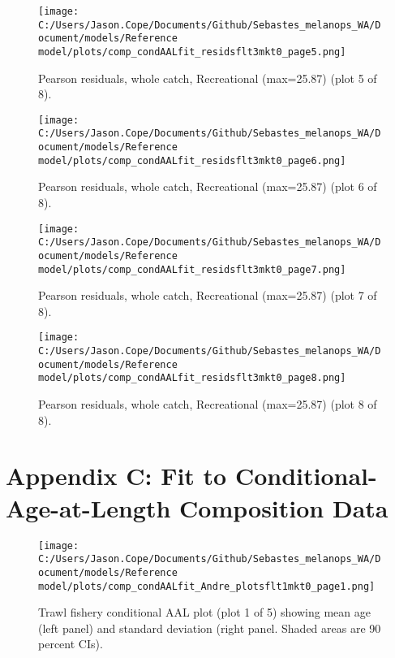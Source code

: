 \documentclass[11pt,
  english,
  letterpaper,
]{article}
\begin{document}
\begin{figure}
\centering
\texttt{[image: C:/Users/Jason.Cope/Documents/Github/Sebastes\_melanops\_WA/Document/models/Reference model/plots/comp\_condAALfit\_residsflt3mkt0\_page5.png]}
\caption{Pearson residuals, whole catch, Recreational (max=25.87) (plot 5 of 8).\label{fig:comp_condAALfit_residsflt3mkt0_page5}}
\end{figure}

\begin{figure}
\centering
\texttt{[image: C:/Users/Jason.Cope/Documents/Github/Sebastes\_melanops\_WA/Document/models/Reference model/plots/comp\_condAALfit\_residsflt3mkt0\_page6.png]}
\caption{Pearson residuals, whole catch, Recreational (max=25.87) (plot 6 of 8).\label{fig:comp_condAALfit_residsflt3mkt0_page6}}
\end{figure}

\begin{figure}
\centering
\texttt{[image: C:/Users/Jason.Cope/Documents/Github/Sebastes\_melanops\_WA/Document/models/Reference model/plots/comp\_condAALfit\_residsflt3mkt0\_page7.png]}
\caption{Pearson residuals, whole catch, Recreational (max=25.87) (plot 7 of 8).\label{fig:comp_condAALfit_residsflt3mkt0_page7}}
\end{figure}

\begin{figure}
\centering
\texttt{[image: C:/Users/Jason.Cope/Documents/Github/Sebastes\_melanops\_WA/Document/models/Reference model/plots/comp\_condAALfit\_residsflt3mkt0\_page8.png]}
\caption{Pearson residuals, whole catch, Recreational (max=25.87) (plot 8 of 8).\label{fig:comp_condAALfit_residsflt3mkt0_page8}}
\end{figure}

\clearpage

\hypertarget{app-c}{%
\section{Appendix C: Fit to Conditional-Age-at-Length Composition Data}\label{app-c}}

\begin{figure}
\centering
\texttt{[image: C:/Users/Jason.Cope/Documents/Github/Sebastes\_melanops\_WA/Document/models/Reference model/plots/comp\_condAALfit\_Andre\_plotsflt1mkt0\_page1.png]}
\caption{Trawl fishery conditional AAL plot (plot 1 of 5) showing mean age (left panel) and standard deviation (right panel. Shaded areas are 90 percent CIs).\label{fig:comp_condAALfit_Andre_plotsflt1mkt0_page1}}
\end{figure}
\end{document}
